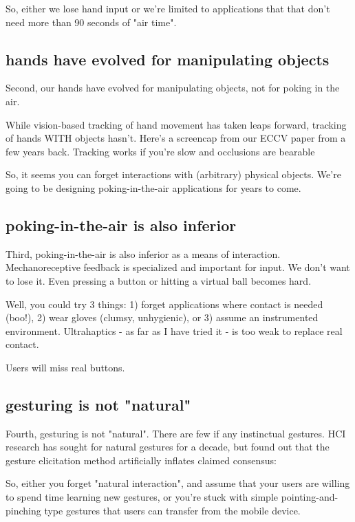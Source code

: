 So, either we lose hand input or we're limited to applications that that don't need more than 90 seconds of "air time". 




\subsection{hands have evolved for manipulating objects}
Second, our hands have evolved for manipulating objects, not for poking in the air. 


While vision-based tracking of hand movement has taken leaps forward, tracking of hands WITH objects hasn't. Here's a screencap from our ECCV paper from a few years back. Tracking works if you're slow and occlusions are bearable


So, it seems you can forget interactions with (arbitrary) physical objects. We're going to be designing poking-in-the-air applications for years to come. 

\subsection{poking-in-the-air is also inferior}
Third, poking-in-the-air is also inferior as a means of interaction. Mechanoreceptive feedback is specialized and important for input. We don't want to lose it. Even pressing a button or hitting a virtual ball becomes hard. 

Well, you could try 3 things: 1) forget applications where contact is needed (boo!), 2) wear gloves (clumsy, unhygienic), or 3) assume an instrumented environment. Ultrahaptics - as far as I have tried it - is too weak to replace real contact. 

Users will miss real buttons. 


\subsection{gesturing is not "natural"}
Fourth, gesturing is not "natural". There are few if any instinctual gestures. HCI research has sought for natural gestures for a decade, but found out that the gesture elicitation method artificially inflates claimed consensus: 

So, either you forget "natural interaction", and assume that your users are willing to spend time learning new gestures, or you're stuck with simple pointing-and-pinching type gestures that users can transfer from the mobile device.



